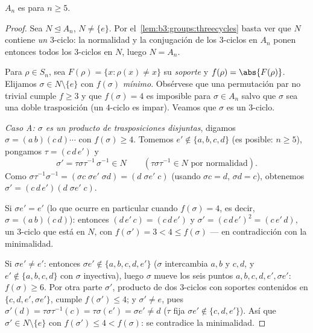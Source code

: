 \begin{theorem}\label{thm:b3:groups:ansimple}
$A_n$ es  para
$n \geq 5$.
\end{theorem}

\begin{proof}
Sea $N \trianglelefteq A_n$, $N \neq \{e\}$. Por
el~\cref{lem:b3:groups:threecycles} basta ver que $N$ contiene \emph{un}
$3$-ciclo: la normalidad y la conjugación de los $3$-ciclos en $A_n$
ponen entonces todos los $3$-ciclos en $N$, luego $N = A_n$.

Para $\rho \in S_n$, sea $F(\rho) = \{x : \rho(x) \neq x\}$ su
\emph{soporte} y $f(\rho) = \abs{F(\rho)}$. Elijamos $\sigma \in N
\setminus \{e\}$ con $f(\sigma)$ \emph{mínimo}. Obsérvese que una
permutación par no trivial cumple $f \geq 3$ y que $f(\sigma) =
4$ es imposible para $\sigma \in A_n$ salvo que $\sigma$ sea una doble
trasposición (un $4$-ciclo es impar). Veamos que $\sigma$ es un
$3$-ciclo.

\emph{Caso A: $\sigma$ es un producto de trasposiciones disjuntas},
digamos $\sigma = (a\,b)(c\,d)\cdots$ con $f(\sigma) \geq 4$. Tomemos
$e'
\notin \{a, b, c, d\}$ (es posible: $n \geq 5$), pongamos $\tau =
(c\,d\,e')$ y
\[
\sigma' = \tau\sigma\tau^{-1}\,\sigma^{-1} \in N
\qquad (\tau\sigma\tau^{-1} \in N \text{ por normalidad}).
\]
Como $\sigma\tau^{-1}\sigma^{-1} = (\sigma c\;\sigma e'\;\sigma
d) = (d\;\sigma e'\;c)$ (usando $\sigma c = d$, $\sigma d = c$),
obtenemos $\sigma' = (c\,d\,e')(d\;\sigma e'\;c)$.

Si $\sigma e' = e'$ (lo que ocurre en particular cuando $f(\sigma) =
4$, es decir, $\sigma = (a\,b)(c\,d)$): entonces $(d\,e'\,c) =
(c\,d\,e')$ y $\sigma' = (c\,d\,e')^2 = (c\,e'\,d)$, un $3$-ciclo que
está en $N$, con $f(\sigma') = 3 < 4 \leq f(\sigma)$ --- en
contradicción con la minimalidad.

Si $\sigma e' \neq e'$: entonces $\sigma e' \notin \{a, b, c, d,
e'\}$ ($\sigma$ intercambia $a,b$ y $c,d$, y $e' \notin \{a,b,c,d\}$ con
$\sigma$ inyectiva), luego $\sigma$ mueve los seis puntos $a, b,
c, d, e', \sigma e'$: $f(\sigma) \geq 6$. Por otra parte $\sigma'$,
producto de dos $3$-ciclos con soportes contenidos en $\{c, d,
e', \sigma e'\}$, cumple $f(\sigma') \leq 4$; y $\sigma' \neq
e$, pues $\sigma'(d) = \tau\sigma\tau^{-1}(c) = \tau\sigma(e') =
\sigma e' \neq d$ ($\tau$ fija $\sigma e' \notin \{c,d,e'\}$). Así que
$\sigma' \in N \setminus\{e\}$ con $f(\sigma') \leq 4 <
f(\sigma)$: se contradice la minimalidad.


\end{proof}
